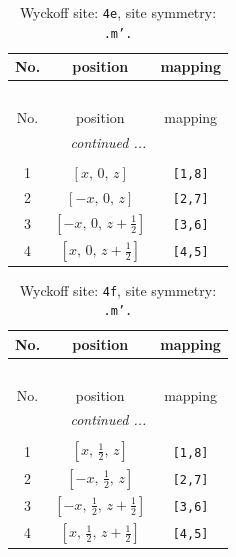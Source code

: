 \documentclass[fleqn,8pt]{jsarticle}
\begin{document}
\begin{longtable}{ccc}
\caption{Wyckoff site: {\tt 4e}, site symmetry: {\tt .m'.}}
 \\
 \hline \hline
No. & position & mapping \\ \hline \endfirsthead

\multicolumn{2}{l}{\tablename\ \thetable{}} \\
 \hline \hline
No. & position & mapping \\ \hline \endhead

 \hline \hline
\multicolumn{2}{r}{\footnotesize\it continued ...} \\ \endfoot

 \hline \hline
\multicolumn{2}{r}{} \\ \endlastfoot

1 & $\left[ x,\, 0,\, z \right]$ & {\tt [1,8]} \\ \hline
2 & $\left[ - x,\, 0,\, z \right]$ & {\tt [2,7]} \\ \hline
3 & $\left[ - x,\, 0,\, z + \frac{1}{2} \right]$ & {\tt [3,6]} \\ \hline
4 & $\left[ x,\, 0,\, z + \frac{1}{2} \right]$ & {\tt [4,5]} \\
\end{longtable}
\renewcommand{\arraystretch}{1.2}
\begin{longtable}{ccc}
\caption{Wyckoff site: {\tt 4f}, site symmetry: {\tt .m'.}}
 \\
 \hline \hline
No. & position & mapping \\ \hline \endfirsthead

\multicolumn{2}{l}{\tablename\ \thetable{}} \\
 \hline \hline
No. & position & mapping \\ \hline \endhead

 \hline \hline
\multicolumn{2}{r}{\footnotesize\it continued ...} \\ \endfoot

 \hline \hline
\multicolumn{2}{r}{} \\ \endlastfoot

1 & $\left[ x,\, \frac{1}{2},\, z \right]$ & {\tt [1,8]} \\ \hline
2 & $\left[ - x,\, \frac{1}{2},\, z \right]$ & {\tt [2,7]} \\ \hline
3 & $\left[ - x,\, \frac{1}{2},\, z + \frac{1}{2} \right]$ & {\tt [3,6]} \\ \hline
4 & $\left[ x,\, \frac{1}{2},\, z + \frac{1}{2} \right]$ & {\tt [4,5]} \\
\end{longtable}
\end{document}
